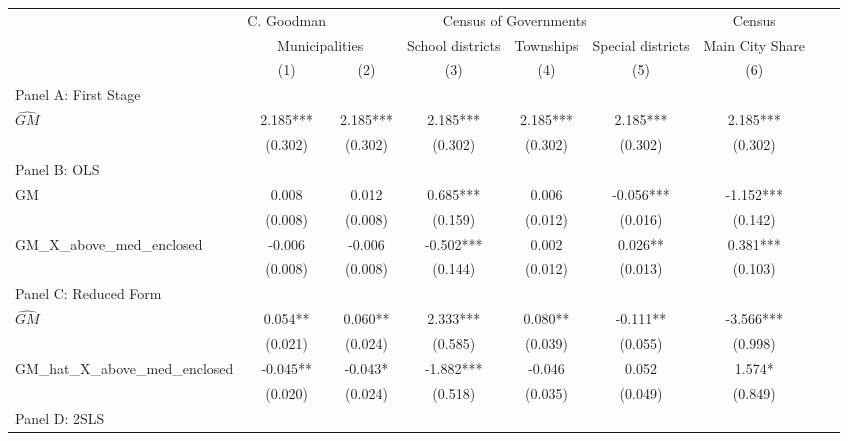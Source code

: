  \begin{tabular}{l*{8}{c}} \toprule
&\multicolumn{1}{c}{C. Goodman}&\multicolumn{4}{c}{Census of Governments}&\multicolumn{1}{c}{Census}\\\cmidrule(lr){2-2}\cmidrule(lr){3-6}\cmidrule(lr){7-7}
&\multicolumn{2}{c}{Municipalities}&\multicolumn{1}{c}{School districts}&\multicolumn{1}{c}{Townships}&\multicolumn{1}{c}{Special districts}&\multicolumn{1}{c}{Main City Share}\\\cmidrule(lr){2-3}\cmidrule(lr){4-6}\cmidrule(lr){7-7}
&\multicolumn{1}{c}{(1)}&\multicolumn{1}{c}{(2)}&\multicolumn{1}{c}{(3)}&\multicolumn{1}{c}{(4)}&\multicolumn{1}{c}{(5)}&\multicolumn{1}{c}{(6)}\\
\cmidrule(lr){1-7}
\multicolumn{6}{l}{Panel A: First Stage}\\
\cmidrule(lr){1-7}
$\widehat{GM}$  &    2.185***&    2.185***&    2.185***&    2.185***&    2.185***&    2.185***\\
                &  (0.302)   &  (0.302)   &  (0.302)   &  (0.302)   &  (0.302)   &  (0.302)   \\
\cmidrule(lr){1-7}
\multicolumn{6}{l}{Panel B: OLS}\\
\cmidrule(lr){1-7}
GM              &    0.008   &    0.012   &    0.685***&    0.006   &   -0.056***&   -1.152***\\
                &  (0.008)   &  (0.008)   &  (0.159)   &  (0.012)   &  (0.016)   &  (0.142)   \\
\addlinespace
GM\_X\_above\_med\_enclosed&   -0.006   &   -0.006   &   -0.502***&    0.002   &    0.026** &    0.381***\\
                &  (0.008)   &  (0.008)   &  (0.144)   &  (0.012)   &  (0.013)   &  (0.103)   \\
\cmidrule(lr){1-7}
\multicolumn{6}{l}{Panel C: Reduced Form}\\
\cmidrule(lr){1-7}
$\widehat{GM}$  &    0.054** &    0.060** &    2.333***&    0.080** &   -0.111** &   -3.566***\\
                &  (0.021)   &  (0.024)   &  (0.585)   &  (0.039)   &  (0.055)   &  (0.998)   \\
\addlinespace
GM\_hat\_X\_above\_med\_enclosed&   -0.045** &   -0.043*  &   -1.882***&   -0.046   &    0.052   &    1.574*  \\
                &  (0.020)   &  (0.024)   &  (0.518)   &  (0.035)   &  (0.049)   &  (0.849)   \\
\cmidrule(lr){1-7}
\multicolumn{6}{l}{Panel D: 2SLS}\\

\end{tabular}
